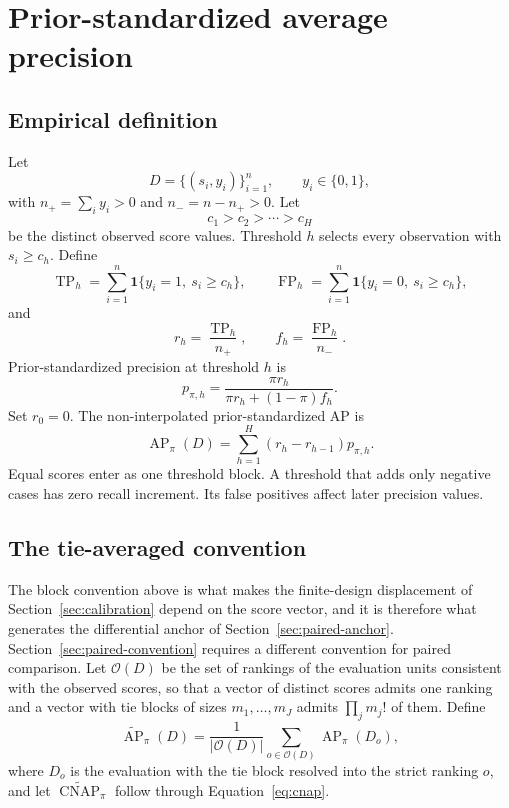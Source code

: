 \documentclass[11pt]{article}
\newcommand{\AP}{\operatorname{AP}}
\newcommand{\CNAP}{\operatorname{CNAP}}
\newcommand{\APta}{\widetilde{\AP}}
\newcommand{\CNAPta}{\widetilde{\CNAP}}
\theoremstyle{remark}
\begin{document}
\appendix

\section{Prior-standardized average precision}
\label{app:ap-definition}

\subsection{Empirical definition}

Let
\[
D=\{(s_i,y_i)\}_{i=1}^{n},
\qquad
y_i\in\{0,1\},
\]
with $n_+=\sum_i y_i>0$ and $n_-=n-n_+>0$. Let
\[
c_1>c_2>\cdots>c_H
\]
be the distinct observed score values. Threshold $h$ selects every observation with $s_i\geq c_h$. Define
\[
\operatorname{TP}_h
=
\sum_{i=1}^{n}
\mathbf{1}\{y_i=1,\ s_i\geq c_h\},
\qquad
\operatorname{FP}_h
=
\sum_{i=1}^{n}
\mathbf{1}\{y_i=0,\ s_i\geq c_h\},
\]
and
\[
r_h=\frac{\operatorname{TP}_h}{n_+},
\qquad
f_h=\frac{\operatorname{FP}_h}{n_-}.
\]
Prior-standardized precision at threshold $h$ is
\[
p_{\pi,h}
=
\frac{\pi r_h}
{\pi r_h+(1-\pi)f_h}.
\]
Set $r_0=0$. The non-interpolated prior-standardized AP is
\begin{equation}
\AP_\pi(D)
=
\sum_{h=1}^{H}
(r_h-r_{h-1})p_{\pi,h}.
\label{eq:empirical-ap}
\end{equation}
Equal scores enter as one threshold block. A threshold that adds only negative cases has zero recall increment. Its false positives affect later precision values.

\subsection{The tie-averaged convention}
\label{app:tie-convention}

The block convention above is what makes the finite-design displacement of Section~\ref{sec:calibration} depend on the score vector, and it is therefore what generates the differential anchor of Section~\ref{sec:paired-anchor}. Section~\ref{sec:paired-convention} requires a different convention for paired comparison. Let $\mathcal{O}(D)$ be the set of rankings of the evaluation units consistent with the observed scores, so that a vector of distinct scores admits one ranking and a vector with tie blocks of sizes $m_1,\ldots,m_J$ admits $\prod_j m_j!$ of them. Define
\begin{equation}
\APta_\pi(D)
=
\frac{1}{|\mathcal{O}(D)|}
\sum_{o\in\mathcal{O}(D)}
\AP_\pi(D_o),
\label{eq:tie-averaged-ap}
\end{equation}
where $D_o$ is the evaluation with the tie block resolved into the strict ranking $o$, and let $\CNAPta_\pi$ follow through Equation~\eqref{eq:cnap}.
\end{document}
